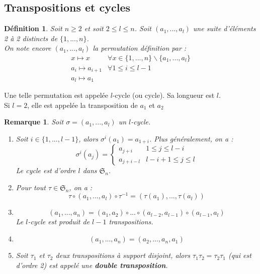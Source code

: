 \documentclass[a4paper, oneside]{report}
\theoremstyle{break}
\newtheorem{defi}[thm]{Définition}
\newtheorem{remar}[thm]{Remarque}
\renewcommand{\S}{\mathfrak{S}}
\begin{document}
\subsection{Transpositions et cycles}

\begin{defi}
	Soit $n\geq 2$ et soit $2 \leq l \leq n$. Soit $(a_1,...,a_l)$ une suite d'éléments 2 à 2 distincts de $\{1,...,n\}$. \\
	On note encore $(a_1,...,a_l)$ la permutation définition par :
	$$\begin{array}{ll}
	x\mapsto x & \forall x \in \{1,...,n \}\backslash \{a_1,...,a_l\}\\
	a_i\mapsto a_{i+1}& \forall 1\leq i \leq l-1\\
	a_l\mapsto a_1&
	\end{array}
	$$
\end{defi}

Une telle permutation est appelée $l$-cycle (ou cycle). Sa longueur est $l$.\\
Si $l=2$, elle est appelée la transposition de $a_1$ et $a_2$

\begin{remar}
	Soit $\sigma=(a_1,...,a_l)$ un $l$-cycle.
	\begin{enumerate}
		\item Soit $i\in \{1,...,l-1\}$, alors $\sigma^i(a_1)=a_{1+i}$. Plus généralement, on a :
		$$\sigma^i(a_j)= \left\{\begin{array}{ll}
		a_{j+i}& 1\leq j \leq l-i\\
		a_{j+i-l}& l-i+1\leq j \leq l
		\end{array}\right.$$
		Le cycle est d'ordre $l$ dans $\S_n$.
		
		\item Pour tout $\tau \in \S_n$, on a :
		$$\tau \circ (a_1,...,a_l) \circ \tau^{-1}=(\tau(a_1),...,\tau(a_l))$$
		
		\item 
		$$ (a_1,...,a_n)=(a_1,a_2)\circ...\circ (a_{l-2}, a_{l-1}) \circ (a_{l-1}, a_l)$$
		Le $l$-cycle est produit de $l-1$ transpositions.
		
		\item 
		$$(a_1,...,a_n)=(a_2,...,a_n,a_1)$$
		
		\item Soit $\tau_1$ et $\tau_2$ deux transpositions à support disjoint, alors $\tau_1\tau_2 = \tau_2\tau_1$ (qui est d'ordre 2) est appelé une \textbf{double transposition}.
		
	\end{enumerate}
\end{remar}
\end{document}
